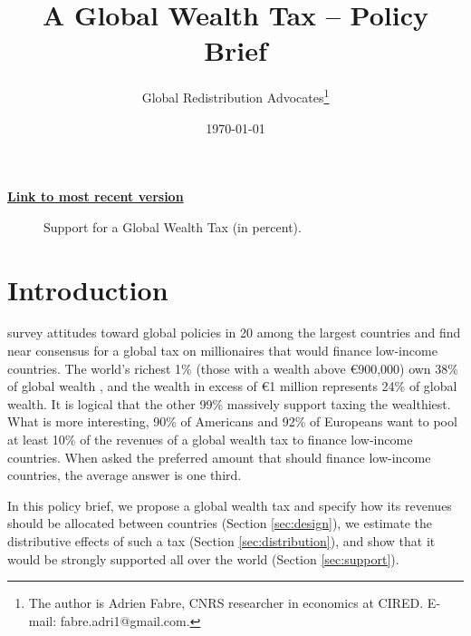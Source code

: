 \documentclass[12pt,english]{article}
\title{A Global Wealth Tax -- Policy Brief
}
\author{Global Redistribution Advocates\footnote{The author is Adrien Fabre, CNRS researcher in economics at CIRED. E-mail: fabre.adri1@gmail.com.}}
\date{\today}
\begin{document}
\maketitle

\begin{center}
{\textbf{\href{https://github.com/bixiou/global_tax_attitudes/raw/main/paper/policy_brief_tax.pdf}{Link to most recent version}}}
\end{center}

\begin{figure}[h!]
  \caption{Support for a Global Wealth Tax (in percent).}\label{fig:support}
\end{figure}

\section{Introduction}\label{sec:intro}

\citet{fabre_international_2023} survey attitudes toward global policies in 20 among the largest countries and find near consensus for a global tax on millionaires that would finance low-income countries. The world's richest 1\% (those with a wealth above \euro{}900,000) own 38\% of global wealth \citep{chancel_world_2022}, and the wealth in excess of \euro{}1 million represents 24\% of global wealth. It is logical that the other 99\% massively support taxing the wealthiest. What is more interesting, 90\% of Americans and 92\% of Europeans want to pool at least 10\% of the revenues of a global wealth tax to finance low-income countries. When asked the preferred amount that should finance low-income countries, the average answer is one third.

In this policy brief, we propose a global wealth tax and specify how its revenues should be allocated between countries (Section \ref{sec:design}), we estimate the distributive effects of such a tax (Section \ref{sec:distribution}), and show that it would be strongly supported all over the world (Section \ref{sec:support}).
\end{document}
